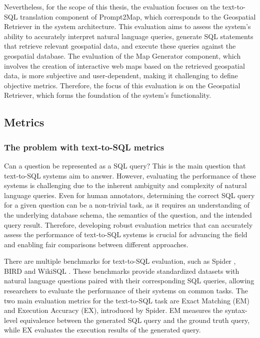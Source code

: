 Nevertheless, for the scope of this thesis, the evaluation focuses on the text-to-SQL translation component of Prompt2Map, which corresponds to the Geospatial Retriever in the system architecture. This evaluation aims to assess the system's ability to accurately interpret natural language queries, generate SQL statements that retrieve relevant geospatial data, and execute these queries against the geospatial database. The evaluation of the Map Generator component, which involves the creation of interactive web maps based on the retrieved geospatial data, is more subjective and user-dependent, making it challenging to define objective metrics. Therefore, the focus of this evaluation is on the Geospatial Retriever, which forms the foundation of the system's functionality.

\subsection{Metrics}

\subsubsection{The problem with text-to-SQL metrics}

Can a question be represented as a SQL query? This is the main question that text-to-SQL systems aim to answer. However, evaluating the performance of these systems is challenging due to the inherent ambiguity and complexity of natural language queries. Even for human annotators, determining the correct SQL query for a given question can be a non-trivial task, as it requires an understanding of the underlying database schema, the semantics of the question, and the intended query result. Therefore, developing robust evaluation metrics that can accurately assess the performance of text-to-SQL systems is crucial for advancing the field and enabling fair comparisons between different approaches.

There are multiple benchmarks for text-to-SQL evaluation, such as Spider \cite{yu_spider_2018}, BIRD \cite{li_can_2023} and WikiSQL \cite{zhongSeq2SQL2017}. These benchmarks provide standardized datasets with natural language questions paired with their corresponding SQL queries, allowing researchers to evaluate the performance of their systems on common tasks. The two main evaluation metrics for the text-to-SQL task are Exact Matching (EM) and Execution Accuracy (EX), introduced by Spider. EM measures the syntax-level equivalence between the generated SQL query and the ground truth query, while EX evaluates the execution results of the generated query.

